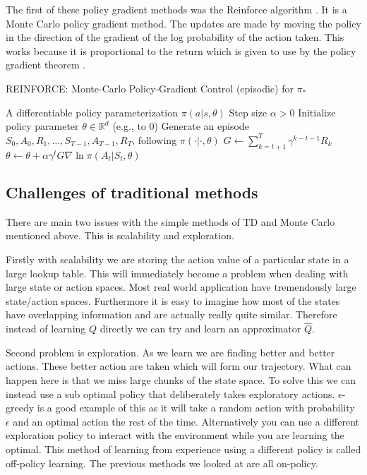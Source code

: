 The first of these policy gradient methods was the Reinforce algorithm \cite{williamsSimpleStatisticalGradientfollowing1992}. It is a Monte Carlo policy gradient method. The updates are made by moving the policy in the direction of the gradient of the log probability of the action taken. This works because it is proportional to the return which is given to use by the policy gradient theorem \cite{suttonPolicyGradientMethods1999}.

\begin{algorithm}
\caption{REINFORCE: Monte-Carlo Policy-Gradient Control (episodic) for $\pi_*$}
\begin{algorithmic}[1]
\Require A differentiable policy parameterization $\pi(a|s, \theta)$
\Require Step size $\alpha > 0$
\State Initialize policy parameter $\theta \in \mathbb{R}^d$ (e.g., to 0)
\Loop
  \State Generate an episode $S_0, A_0, R_1, \ldots, S_{T-1}, A_{T-1}, R_T$, following $\pi(\cdot|\cdot, \theta)$
    \State $G \leftarrow \sum_{k=t+1}^{T} \gamma^{k-t-1} R_k$
    \State $\theta \leftarrow \theta + \alpha \gamma^t G \nabla \ln \pi(A_t|S_t, \theta)$
  \EndFor
\EndLoop
\end{algorithmic}
\end{algorithm}

\subsection{Challenges of traditional methods}

There are main two issues with the simple methods of TD and Monte Carlo mentioned above. This is scalability and exploration.

Firstly with scalability we are storing the action value of a particular state in a large lookup table. This will immediately become a problem when dealing with large state or action spaces. Most real world application have tremendously large state/action spaces. Furthermore it is easy to imagine how most of the states have overlapping information and are actually really quite similar. Therefore instead of learning $Q$ directly we can try and learn an approximator $\hat{Q}$.

Second problem is exploration. As we learn we are finding better and better actions. These better action are taken which will form our trajectory. What can happen here is that we miss large chunks of the state space. To solve this we can instead use a sub optimal policy that deliberately takes exploratory actions. $\epsilon$-greedy is a good example of this as it will take a random action with probability $\epsilon$ and an optimal action the rest of the time. Alternatively you can use a different exploration policy to interact with the environment while you are learning the optimal. This method of learning from experience using a different policy is called off-policy learning. The previous methods we looked at are all on-policy.

